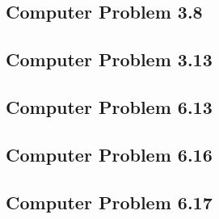 \documentclass[paper=a4, fontsize=11pt]{scrartcl}
\numberwithin{equation}{section}		%
\numberwithin{figure}{section}			%
\numberwithin{table}{section}				%
\begin{document}
\pagebreak
\subsection{Computer Problem 3.8}


\pagebreak
\subsection{Computer Problem 3.13}


\pagebreak
\subsection{Computer Problem 6.13}


\pagebreak
\subsection{Computer Problem 6.16}


\pagebreak
\subsection{Computer Problem 6.17}



\end{document}
